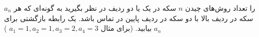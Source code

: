 \EXERCISE
$a_n$
را تعداد روش‌های چیدن
$n$
سکه در یک یا دو ردیف در نظر بگیرید به گونه‌ای که هر سکه در ردیف بالا با دو سکه در ردیف پایین در تماس باشد. یک رابطه بازگشتی برای
$a_n$
بیابید. (برای مثال 
$a_1 = 1, a_2 = 1, a_3 = 2, a_4 = 3$
)